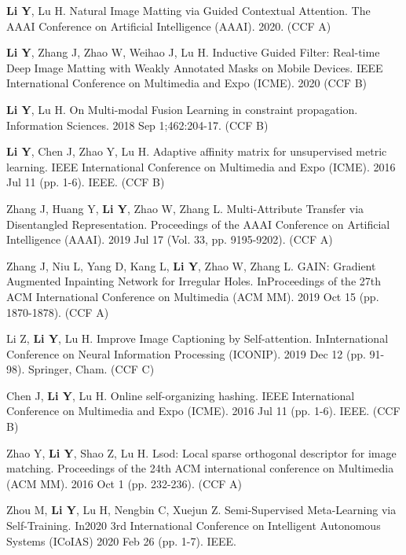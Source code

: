 

\begin{publications}
  \item {\bf{Li Y}}, Lu H. Natural Image Matting via Guided Contextual Attention. The AAAI Conference on Artificial Intelligence (AAAI). 2020. (CCF A)
  \item {\bf{Li Y}}, Zhang J, Zhao W, Weihao J, Lu H. Inductive Guided Filter: Real-time Deep Image Matting with Weakly Annotated Masks on Mobile Devices. IEEE International Conference on Multimedia and Expo (ICME). 2020  (CCF B)
  \item {\bf{Li Y}}, Lu H. On Multi-modal Fusion Learning in constraint propagation. Information Sciences. 2018 Sep 1;462:204-17. (CCF B)
  \item {\bf{Li Y}}, Chen J, Zhao Y, Lu H. Adaptive affinity matrix for unsupervised metric learning. IEEE International Conference on Multimedia and Expo (ICME). 2016 Jul 11 (pp. 1-6). IEEE. (CCF B)
  \item Zhang J, Huang Y, {\bf{Li Y}}, Zhao W, Zhang L. Multi-Attribute Transfer via Disentangled Representation. Proceedings of the AAAI Conference on Artificial Intelligence (AAAI). 2019 Jul 17 (Vol. 33, pp. 9195-9202). (CCF A)
  \item Zhang J, Niu L, Yang D, Kang L, {\bf{Li Y}}, Zhao W, Zhang L. GAIN: Gradient Augmented Inpainting Network for Irregular Holes. InProceedings of the 27th ACM International Conference on Multimedia (ACM MM). 2019 Oct 15 (pp. 1870-1878). (CCF A)
  \item Li Z, {\bf{Li Y}}, Lu H. Improve Image Captioning by Self-attention. InInternational Conference on Neural Information Processing (ICONIP). 2019 Dec 12 (pp. 91-98). Springer, Cham. (CCF C)
  \item Chen J, {\bf{Li Y}}, Lu H. Online self-organizing hashing. IEEE International Conference on Multimedia and Expo (ICME). 2016 Jul 11 (pp. 1-6). IEEE. (CCF B)
  \item Zhao Y, {\bf{Li Y}}, Shao Z, Lu H. Lsod: Local sparse orthogonal descriptor for image matching. Proceedings of the 24th ACM international conference on Multimedia (ACM MM). 2016 Oct 1 (pp. 232-236). (CCF A)
  \item Zhou M, {\bf{Li Y}}, Lu H, Nengbin C, Xuejun Z. Semi-Supervised Meta-Learning via Self-Training. In2020 3rd International Conference on Intelligent Autonomous Systems (ICoIAS) 2020 Feb 26 (pp. 1-7). IEEE.
\end{publications}

